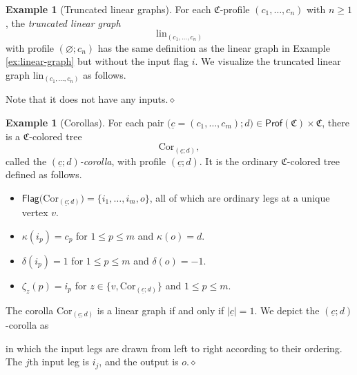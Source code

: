 \documentclass[11pt]{amsbook}
\numberwithin{section}{chapter}
\numberwithin{subsection}{section}
\numberwithin{equation}{section}
\theoremstyle{plain}
\theoremstyle{definition}
\newtheorem{example}[equation]{Example}
\newcommand{\colorc}{\mathfrak{C}}
\newcommand{\Cor}{\mathrm{Cor}}
\newcommand{\Flag}{\mathsf{Flag}}
\newcommand{\lin}{\mathrm{lin}}
\newcommand{\Prof}{\mathsf{Prof}}
\newcommand{\Profc}{\Prof(\colorc)}
\newcommand{\Profcc}{\Profc \times \colorc}
\newcommand{\dqed}{\hfill$\diamond$}
\newcommand{\uc}{\underline c}
\begin{document}
\begin{example}[Truncated linear graphs]\label{ex:truncated-linear-graph}
For each $\colorc$-profile $(c_1,\ldots,c_n)$ with $n \geq 1$, the \emph{truncated linear graph} \[\lin_{(c_1,\ldots,c_n)}\] with profile $(\varnothing;c_n)$ has the same definition as the linear graph in Example \ref{ex:linear-graph} but without the input flag $i$.  We visualize the truncated linear graph $\lin_{(c_1,\ldots,c_n)}$ as follows.
\begin{center}\end{center}
Note that it does not have any inputs.\dqed
\end{example}

\begin{example}[Corollas]\label{ex:cd-corolla}
For each pair $\bigl(\uc=(c_1,\ldots,c_m); d\bigr) \in \Profcc$, there is a $\colorc$-colored tree \[\Cor_{(\uc;d)},\] called the \emph{$(\uc;d)$-corolla}\label{notation:cdcorolla}, with profile $(\uc;d)$.  It is the ordinary $\colorc$-colored tree defined as follows.
\begin{itemize}
\item $\Flag\bigl(\Cor_{(\uc;d)}\bigr) = \{i_1,\ldots,i_{m},o\}$, all of which are ordinary legs at a unique vertex $v$.
\item $\kappa(i_p)=c_p$ for $1 \leq p \leq m$ and $\kappa(o)=d$.
\item $\delta(i_p)=1$ for $1 \leq p \leq m$ and $\delta(o)=-1$.
\item $\zeta_z(p)=i_p$ for $z \in \bigl\{v, \Cor_{(\uc;d)}\bigr\}$ and $1 \leq p \leq m$.
\end{itemize}
The corolla $\Cor_{(\uc;d)}$ is a linear graph if and only if $|\uc|=1$.  We depict the $(\uc;d)$-corolla as
\begin{center}\end{center}
in which the input legs are drawn from left to right according to their ordering.  The $j$th input leg is $i_j$, and the output is $o$.\dqed
\end{example}
\end{document}
